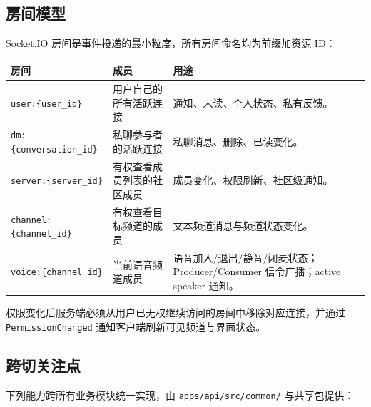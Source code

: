 \subsection{房间模型}

Socket.IO 房间是事件投递的最小粒度，所有房间命名均为前缀加资源 ID：

\noindent\begin{tabularx}{\textwidth}{L{3.8cm}L{4.4cm}Y}
  \toprule
  房间 & 成员 & 用途 \\
  \midrule
  \texttt{user:\{user\_id\}} & 用户自己的所有活跃连接 & 通知、未读、个人状态、私有反馈。 \\
  \texttt{dm:\{conversation\_id\}} & 私聊参与者的活跃连接 & 私聊消息、删除、已读变化。 \\
  \texttt{server:\{server\_id\}} & 有权查看成员列表的社区成员 & 成员变化、权限刷新、社区级通知。 \\
  \texttt{channel:\{channel\_id\}} & 有权查看目标频道的成员 & 文本频道消息与频道状态变化。 \\
  \texttt{voice:\{channel\_id\}} & 当前语音频道成员 & 语音加入/退出/静音/闭麦状态；Producer/Consumer 信令广播；active speaker 通知。 \\
  \bottomrule
\end{tabularx}

权限变化后服务端必须从用户已无权继续访问的房间中移除对应连接，并通过 \texttt{PermissionChanged} 通知客户端刷新可见频道与界面状态。

\subsection{跨切关注点}

下列能力跨所有业务模块统一实现，由 \texttt{apps/api/src/common/} 与共享包提供：

